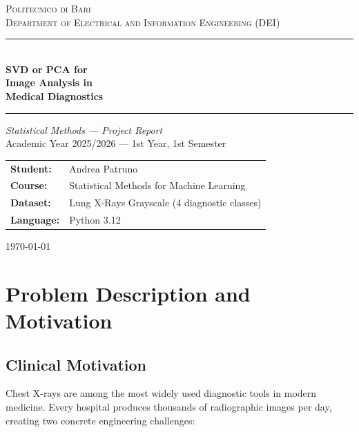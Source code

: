 \documentclass[11pt,a4paper]{article}
\theoremstyle{definition}
\begin{document}
\begin{titlepage}
  \centering
  \vspace*{1.5cm}

  {\Large\scshape Politecnico di Bari\\[6pt]
  Department of Electrical and Information Engineering (DEI)}

  \vspace{1cm}
  \rule{\linewidth}{1.2pt}\\[8pt]
  {\Huge\bfseries SVD or PCA for\\[6pt] Image Analysis in\\[6pt] Medical Diagnostics}\\[8pt]
  \rule{\linewidth}{1.2pt}

  \vspace{1.5cm}
  {\large\itshape Statistical Methods --- Project Report}\\[0.4cm]
  {\large Academic Year 2025/2026 --- 1st Year, 1st Semester}

  \vspace{1.5cm}
  \begin{tabular}{ll}
    \textbf{Student:}  & Andrea Patruno \\[4pt]
    \textbf{Course:}   & Statistical Methods for Machine Learning \\[4pt]
    \textbf{Dataset:}  & Lung X-Rays Grayscale (4 diagnostic classes) \\[4pt]
    \textbf{Language:} & Python 3.12 \\
  \end{tabular}

  \vfill
  {\small\today}
\end{titlepage}

\tableofcontents
\newpage

\section{Problem Description and Motivation}

\subsection{Clinical Motivation}

Chest X-rays are among the most widely used diagnostic tools in modern medicine.
Every hospital produces thousands of radiographic images per day, creating two
concrete engineering challenges:
\end{document}
